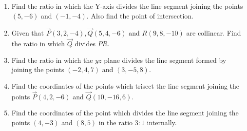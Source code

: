 \begin{enumerate}[label=\thesubsection.\arabic*,ref=\thesubsection.\theenumi]
\item Find the ratio in which the Y-axis divides the line segment joining the points $(5,-6)$ and $(-1,-4)$. Also find the point of intersection.
\item Given that $\vec{P}(3,2,-4), \vec{Q}(5,4,-6)$ and $R(9,8,-10)$ are collinear. Find the ratio in which $\vec{Q}$ divides $PR$.
\item Find the ratio in which the $yz$ plane divides the line segment formed by joining the points $(-2,4,7)$ and $(3,-5,8)$.
\item Find the coordinates of the points which trisect the line segment joining the points $\vec{P}(4,2,-6)$ and $\vec{Q}(10,-16,6)$.
\item Find the coordinates of the point which divides the line segment joining the points $(4,-3)$ and $(8,5)$ in the ratio $3:1$ internally.
\end{enumerate}
